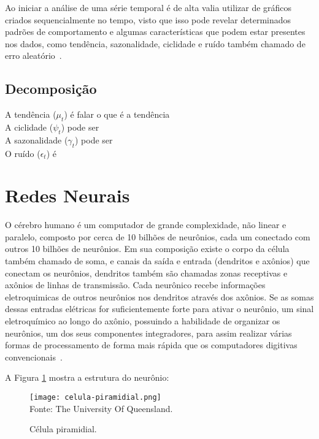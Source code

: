     
    Ao iniciar a análise de uma série temporal é de alta valia utilizar de gráficos criados sequencialmente no tempo,
    visto que isso pode revelar determinados padrões de comportamento e algumas características que podem estar 
    presentes nos dados, como tendência, sazonalidade, ciclidade e ruído também chamado de erro aleatório~\cite{costa2019}. 

    \subsection{Decomposição}

        A tendência ($\mu_t$) é falar o que é a tendência \\
        
        A ciclidade ($\psi_t$) pode ser \\
        
        A sazonalidade ($\gamma_t$) pode ser \\
        
        O ruído ($\epsilon_t$) é 




\section{Redes Neurais}
    O cérebro humano é um computador de grande complexidade, não linear e paralelo, 
    composto por cerca de 10 bilhões de neurônios, cada um conectado com outros 10 
    bilhões de neurônios. Em sua composição existe o corpo da célula também chamado de 
    soma, e canais da saída e entrada (dendritos e axônios) que conectam os neurônios, 
    dendritos também são chamadas zonas receptivas e axônios de linhas de transmissão. 
    Cada neurônico recebe informações eletroquimicas de outros neurônios nos dendritos 
    através dos axônios. Se as somas dessas entradas elétricas for suficientemente forte 
    para ativar o neurônio, um sinal eletroquímico ao longo do axônio, possuindo a 
    habilidade de organizar os neurônios, um dos seus componentes integradores, para 
    assim realizar várias formas de processamento de forma mais rápida que os 
    computadores digitivas convencionais~\cite{haykin2009neural}.

    A Figura \ref{fig:celula_piramidial} mostra a estrutura do neurônio:
    \begin{figure}[!htb]
        \centering
        \caption{Célula piramidial.}
        \texttt{[image: celula-piramidial.png]}\\
        {\footnotesize Fonte: The University Of Queensland.}\
        \label{fig:celula_piramidial}
    \end{figure}
        
